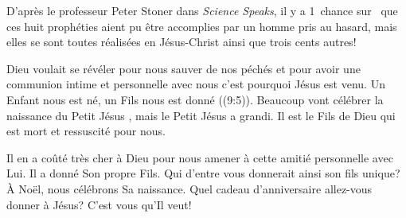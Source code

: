 D'après le professeur Peter Stoner dans \emph{Science Speaks}, il y a 1~chance sur~ que ces huit prophéties aient pu être accomplies par un homme pris au hasard, mais elles se sont toutes réalisées en Jésus-Christ ainsi que trois cents autres!

Dieu voulait se révéler pour nous sauver de nos péchés et pour avoir une communion intime et personnelle avec nous\frcolon{} c'est pourquoi Jésus est venu. \Og Un Enfant nous est né, un Fils nous est donné \Fg{} ((9:5)). Beaucoup vont célébrer la naissance du \Og Petit Jésus \Fg{}, mais le \Og Petit Jésus \Fg{} a grandi. Il est le Fils de Dieu qui est mort et ressuscité pour nous.

Il en a coûté très cher à Dieu pour nous amener à cette amitié personnelle avec Lui. Il a donné Son propre Fils. Qui d'entre vous donnerait ainsi son fils unique? À Noël, nous célébrons Sa naissance. Quel cadeau d'anniversaire allez-vous donner à Jésus? C'est vous qu'Il veut!


\begin{dvquotes}
\end{dvquotes}

